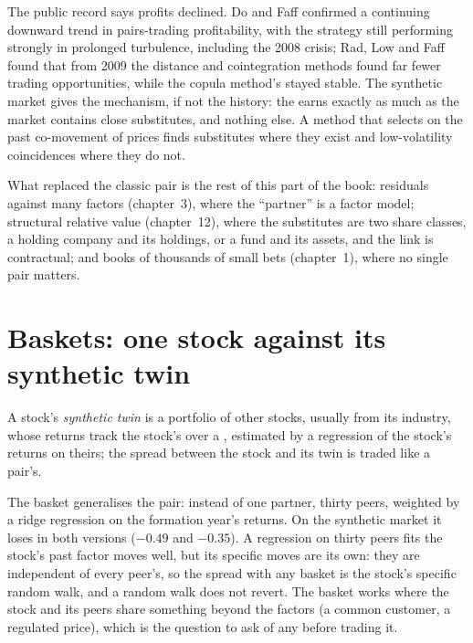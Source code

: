 The public record says profits declined. Do and Faff confirmed a continuing downward trend in pairs-trading profitability, with the strategy still
performing strongly in prolonged turbulence, including the 2008 crisis; Rad, Low and Faff found that from 2009 the distance and cointegration methods found
far fewer trading opportunities, while the copula method's stayed stable. The synthetic market gives the mechanism, if not the history: the 
earns exactly as much as the market contains close substitutes, and nothing else. A method that selects on the past co-movement of prices finds
substitutes where they exist and low-volatility coincidences where they do not.

What replaced the classic pair is the rest of this part of the book: residuals against many factors (chapter~3), where the ``partner'' is a factor model;
structural relative value (chapter~12), where the substitutes are two share classes, a holding company and its holdings, or a fund and its assets, and the
link is contractual; and books of thousands of small bets (chapter~1), where no single pair matters.

\section{Baskets: one stock against its synthetic twin}

\begin{definition}\label{def:s1:pairs-and-baskets:twin}
A stock's \emph{synthetic twin} is a portfolio of other stocks, usually from its industry, whose returns track the stock's over a
, estimated by a regression of the stock's returns on theirs; the spread between the stock and its twin is traded like a pair's.
\end{definition}

The basket generalises the pair: instead of one partner, thirty peers, weighted by a ridge regression on the formation year's returns. On the synthetic
market it loses in both versions ($-0.49$ and $-0.35$). A regression on thirty peers fits the stock's past factor moves well, but its specific moves are its
own: they are independent of every peer's, so the spread with any basket is the stock's specific random walk, and a random walk does not revert. The basket
works where the stock and its peers share something beyond the factors (a common customer, a regulated price), which is the question to ask of any
 before trading it.

